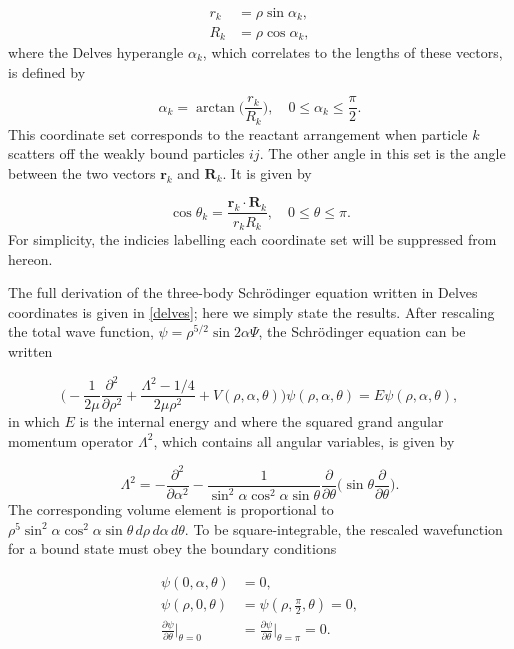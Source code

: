 \begin{align}
r_{k} &= \rho \sin{\alpha_{k}},\\
R_{k} &= \rho \cos{\alpha_{k}},
\end{align}
where the Delves hyperangle $\alpha_{k}$, which correlates to the lengths of these vectors, is defined by

\begin{equation}
\alpha_{k} = \arctan\bigg(\frac{r_{k}}{R_{k}}\bigg), \quad 0\leq \alpha_{k} \leq \frac{\pi}{2}.
\end{equation}
This coordinate set corresponds to the reactant arrangement when particle $k$ scatters off the weakly bound particles $ij$. The other angle in this set is the angle between the two vectors $\mathbf{r}_{k}$ and $\mathbf{R}_{k}$. It is given by

\begin{equation}
\cos{\theta_{k}} = \frac{\mathbf{r}_{k} \cdot \mathbf{R}_{k}}{r_{k} R_{k}}, \quad  0\leq \theta \leq \pi.
\end{equation}
For simplicity, the indicies labelling each coordinate set will be suppressed from hereon. 

The full derivation of the three-body Schr{\"o}dinger equation written in Delves coordinates is given in \cref{delves}; here we simply state the results. After rescaling the total wave function, $\psi = \rho^{5/2}\sin2\alpha\Psi$, the Schr{\"o}dinger equation can be written

\begin{equation}
\bigg(-\frac{1}{2\mu}\frac{\partial^2}{\partial\rho^2} + \frac{\Lambda^2 - 1/4}{2\mu\rho^2} + V(\rho,\alpha,\theta)\bigg) \psi(\rho,\alpha,\theta) = E \psi(\rho,\alpha,\theta),
\end{equation}
in which $E$ is the internal energy and where the squared grand angular momentum operator $\Lambda^2$, which contains all angular variables, is given by

\begin{equation}
\Lambda^2 = -\frac{\partial^2}{\partial\alpha^2} - \frac{1}{\sin^2\alpha\cos^2\alpha\sin\theta} \frac{\partial}{\partial\theta} \bigg( \sin\theta \frac{\partial}{\partial\theta}\bigg).
\end{equation}
The corresponding volume element is proportional to $\rho^5\sin^2\alpha\cos^2\alpha\sin\theta \,d\rho\,d\alpha\, d\theta$. To be square-integrable, the rescaled wavefunction for a bound state must obey the boundary conditions

\begin{align}
\psi(0,\alpha,\theta) &= 0,\\
\psi(\rho,0,\theta)    &= \psi(\rho,\frac{\pi}{2},\theta) = 0,\\
\frac{\partial\psi}{\partial\theta}\bigg\rvert_{\theta = 0} &= \frac{\partial\psi}{\partial\theta}\bigg\rvert_{\theta = \pi} = 0.
\end{align} 

